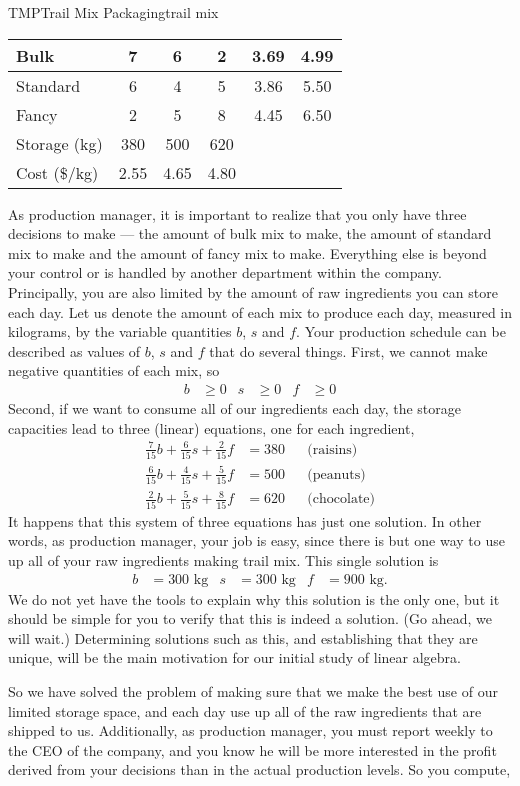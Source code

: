 \begin{example}{TMP}{Trail Mix Packaging}{trail mix}
\begin{center}
\begin{tabular}{l*5{|c}}
Bulk&7&6&2&3.69&4.99\\\hline
Standard&6&4&5&3.86&5.50\\\hline
Fancy&2&5&8&4.45&6.50\\\hline\hline
Storage (kg)&380&500&620&&\\\hline
Cost (\$/kg)&2.55&4.65&4.80&&
\end{tabular}
\end{center}
%
As production manager, it is important to realize that you only have three decisions to make --- the amount of bulk mix to make, the amount of standard mix to make and the amount of fancy mix to make.  Everything else is beyond your control or is handled by another department within the company.  Principally, you are also limited by the amount of raw ingredients you can store each day.  Let us denote the amount of each mix to produce each day, measured in kilograms, by the variable quantities $b$, $s$ and $f$.  Your production schedule can be described as values of $b$, $s$ and $f$ that do several things.  First, we cannot make negative quantities of each mix, so
%
\begin{align*}
b&\geq 0  &  s&\geq 0  &  f&\geq 0
\end{align*}
%
Second, if we want to consume all of our ingredients each day, the storage capacities lead to three (linear) equations, one for each ingredient,
%
\begin{align*}
\frac{7}{15}b+\frac{6}{15}s+\frac{2}{15}f&=380&&\text{(raisins)}\\
\frac{6}{15}b+\frac{4}{15}s+\frac{5}{15}f&=500&&\text{(peanuts)}\\
\frac{2}{15}b+\frac{5}{15}s+\frac{8}{15}f&=620&&\text{(chocolate)}
\end{align*}
%
It happens that this system of three equations has just one solution.  In other words, as production manager, your job is easy, since there is but one way to use up all of your raw ingredients making trail mix.  This single solution is
%
\begin{align*}
b&=300\text{ kg}
&
s&=300\text{ kg}
&
f&=900\text{ kg}.
\end{align*}
%
We do not yet have the tools to explain why this solution is the only one, but it should be simple for you to verify that this is indeed a solution.  (Go ahead, we will wait.)  Determining solutions such as this, and establishing that they are unique, will be the main motivation for our initial study of linear algebra.\par
%
So we have solved the problem of making sure that we make the best use of our limited storage space, and each day use up all of the raw ingredients that are shipped to us.  Additionally, as production manager, you must report weekly to the CEO of the company, and you know he will be more interested in the profit derived from your decisions than in the actual production levels.  So you compute,

\end{example}

